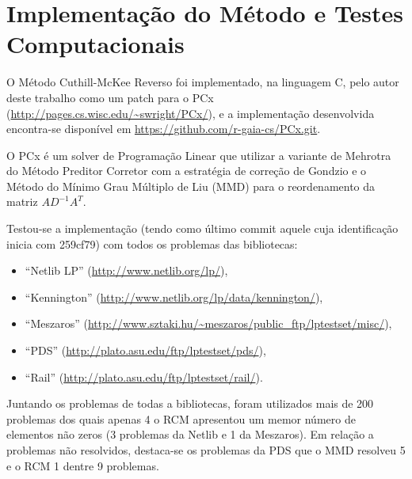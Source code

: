 \section{Implementação do Método e Testes Computacionais}
O Método Cuthill-McKee Reverso foi implementado, na linguagem C, pelo autor
deste trabalho como um patch para o PCx
(\url{http://pages.cs.wisc.edu/~swright/PCx/}), e a implementação desenvolvida
encontra-se disponível em \url{https://github.com/r-gaia-cs/PCx.git}.

O PCx é um solver de Programação Linear que utilizar a variante de Mehrotra do
Método Preditor Corretor com a estratégia de correção de Gondzio e o Método do
Mínimo Grau Múltiplo de Liu\cite{George:1981:ComputerSolutionPD} (MMD) para o
reordenamento da matriz $A D^{-1} A^T$.

Testou-se a implementação (tendo como último commit aquele cuja identificação
inicia com 259cf79) com todos os problemas das bibliotecas:
\begin{itemize}
  \item ``Netlib LP'' (\url{http://www.netlib.org/lp/}),
  \item ``Kennington'' (\url{http://www.netlib.org/lp/data/kennington/}),
  \item ``Meszaros'' (\url{http://www.sztaki.hu/~meszaros/public_ftp/lptestset/misc/}),
  \item ``PDS'' (\url{http://plato.asu.edu/ftp/lptestset/pds/}),
  \item ``Rail'' (\url{http://plato.asu.edu/ftp/lptestset/rail/}).
\end{itemize}

Juntando os problemas de todas a bibliotecas, foram utilizados mais de 200
problemas dos quais apenas 4 o RCM apresentou um memor número de elementos não
zeros (3 problemas da Netlib e 1 da Meszaros). Em relação a problemas não
resolvidos, destaca-se os problemas da PDS que o MMD resolveu 5 e o RCM 1
dentre 9 problemas.

